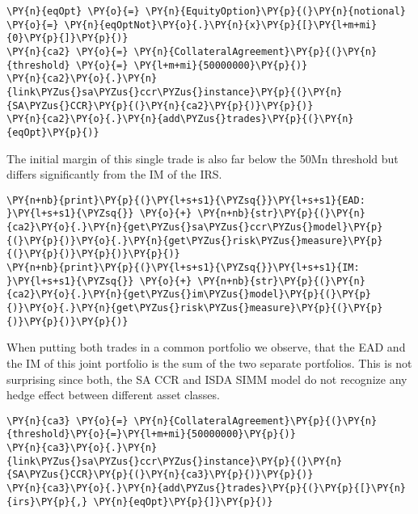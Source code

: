     \begin{tcolorbox}[breakable, size=fbox, boxrule=1pt, pad at break*=1mm,colback=cellbackground, colframe=cellborder]
\begin{Verbatim}[commandchars=\\\{\}]
\PY{n}{eqOpt} \PY{o}{=} \PY{n}{EquityOption}\PY{p}{(}\PY{n}{notional} \PY{o}{=} \PY{n}{eqOptNot}\PY{o}{.}\PY{n}{x}\PY{p}{[}\PY{l+m+mi}{0}\PY{p}{]}\PY{p}{)}
\PY{n}{ca2} \PY{o}{=} \PY{n}{CollateralAgreement}\PY{p}{(}\PY{n}{threshold} \PY{o}{=} \PY{l+m+mi}{50000000}\PY{p}{)}
\PY{n}{ca2}\PY{o}{.}\PY{n}{link\PYZus{}sa\PYZus{}ccr\PYZus{}instance}\PY{p}{(}\PY{n}{SA\PYZus{}CCR}\PY{p}{(}\PY{n}{ca2}\PY{p}{)}\PY{p}{)}
\PY{n}{ca2}\PY{o}{.}\PY{n}{add\PYZus{}trades}\PY{p}{(}\PY{n}{eqOpt}\PY{p}{)}
\end{Verbatim}
\end{tcolorbox}

    The initial margin of this single trade is also far below the 50Mn
threshold but differs significantly from the IM of the IRS.

    \begin{tcolorbox}[breakable, size=fbox, boxrule=1pt, pad at break*=1mm,colback=cellbackground, colframe=cellborder]
\begin{Verbatim}[commandchars=\\\{\}]
\PY{n+nb}{print}\PY{p}{(}\PY{l+s+s1}{\PYZsq{}}\PY{l+s+s1}{EAD: }\PY{l+s+s1}{\PYZsq{}} \PY{o}{+} \PY{n+nb}{str}\PY{p}{(}\PY{n}{ca2}\PY{o}{.}\PY{n}{get\PYZus{}sa\PYZus{}ccr\PYZus{}model}\PY{p}{(}\PY{p}{)}\PY{o}{.}\PY{n}{get\PYZus{}risk\PYZus{}measure}\PY{p}{(}\PY{p}{)}\PY{p}{)}\PY{p}{)}
\PY{n+nb}{print}\PY{p}{(}\PY{l+s+s1}{\PYZsq{}}\PY{l+s+s1}{IM:  }\PY{l+s+s1}{\PYZsq{}} \PY{o}{+} \PY{n+nb}{str}\PY{p}{(}\PY{n}{ca2}\PY{o}{.}\PY{n}{get\PYZus{}im\PYZus{}model}\PY{p}{(}\PY{p}{)}\PY{o}{.}\PY{n}{get\PYZus{}risk\PYZus{}measure}\PY{p}{(}\PY{p}{)}\PY{p}{)}\PY{p}{)}
\end{Verbatim}
\end{tcolorbox}

    When putting both trades in a common portfolio we observe, that the EAD
and the IM of this joint portfolio is the sum of the two separate
portfolios. This is not surprising since both, the SA CCR and ISDA SIMM
model do not recognize any hedge effect between different asset classes.

    \begin{tcolorbox}[breakable, size=fbox, boxrule=1pt, pad at break*=1mm,colback=cellbackground, colframe=cellborder]
\begin{Verbatim}[commandchars=\\\{\}]
\PY{n}{ca3} \PY{o}{=} \PY{n}{CollateralAgreement}\PY{p}{(}\PY{n}{threshold}\PY{o}{=}\PY{l+m+mi}{50000000}\PY{p}{)}
\PY{n}{ca3}\PY{o}{.}\PY{n}{link\PYZus{}sa\PYZus{}ccr\PYZus{}instance}\PY{p}{(}\PY{n}{SA\PYZus{}CCR}\PY{p}{(}\PY{n}{ca3}\PY{p}{)}\PY{p}{)}
\PY{n}{ca3}\PY{o}{.}\PY{n}{add\PYZus{}trades}\PY{p}{(}\PY{p}{[}\PY{n}{irs}\PY{p}{,} \PY{n}{eqOpt}\PY{p}{]}\PY{p}{)}
\end{Verbatim}
\end{tcolorbox}

